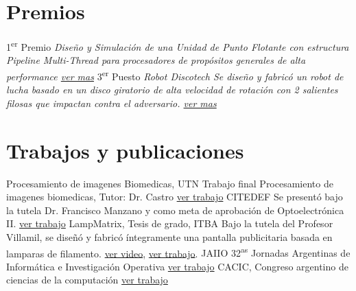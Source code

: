 \documentclass[11pt,a4paper,sans]{moderncv} 	%
\begin{document}
\section{Premios}
 					{1\textsuperscript{er} Premio} {}{}{\em{Diseño y Simulación de una Unidad de Punto Flotante con estructura Pipeline Multi-Thread para procesadores de propósitos generales de alta performance} \em \href{http://disenioconingenio.com.ar/shop/docs/i+d_itba_2002.pdf}{ver mas}}
	{3\textsuperscript{er} Puesto} {}{}{\em{Robot Discotech} \newline \em{Se diseño y fabricó un robot de lucha basado en un disco giratorio de alta velocidad de rotación con 2 salientes filosas que impactan contra el adversario. \href{http://disenioconingenio.com.ar/producto.php?products_id=378}{ver mas}}}
\section{Trabajos y publicaciones}
 														{Procesamiento de imagenes Biomedicas, UTN} 							{}{}{Trabajo final Procesamiento de imagenes biomedicas, Tutor: Dr. Castro 								\href{http://disenioconingenio.com.ar/shop/docs/Final_ooffice.pdf} 								{ver trabajo}}
 										{CITEDEF} 											{}{}{Se presentó bajo la tutela Dr. Francisco Manzano y como meta de aprobación de Optoelectrónica II. 					\href{http://disenioconingenio.com.ar/shop/docs/citedef_2008.pdf} 								{ver trabajo}}
 		{LampMatrix, Tesis de grado, ITBA} 								{}{}{Bajo la tutela del Profesor Villamil, se diseñó y fabricó íntegramente una pantalla publicitaria basada en lamparas de filamento. 	\href{http://www.youtube.com/watch?v=Usx4YUNpknc}{ver video}, \href{http://disenioconingenio.com.ar/shop/docs/lampmatrix.pdf} 	{ver trabajo}.}
 					{JAIIO 32\textsuperscript{as} Jornadas Argentinas de Informática e Investigación Operativa} 	{}{}																	{\href{http://disenioconingenio.com.ar/shop/docs/jaiio2003.pdf} 								{ver trabajo}}
 								{CACIC, Congreso argentino de ciencias de la computación} 					{}{} 																	{\href{http://disenioconingenio.com.ar/shop/docs/cacic2003.pdf} 								{ver trabajo}}
\end{document}

